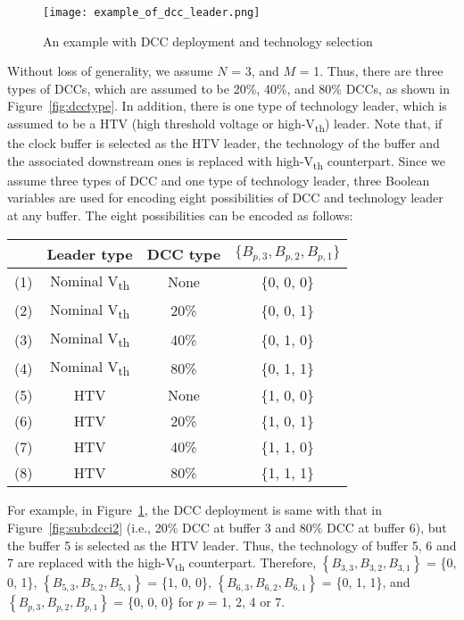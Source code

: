 \begin{figure}
    \centering
    \texttt{[image: example\_of\_dcc\_leader.png]}
    \caption{An example with DCC deployment and technology selection}
    \label{fig:example_dcc_tva}
\end{figure}

Without loss of generality, we assume $N$ = 3, and $M$ = 1. Thus, there are three types of DCCs, which are assumed to be 20\%, 40\%, and 80\% DCCs, as shown in Figure~\ref{fig:dcctype}. In addition, there is one type of technology leader, which is assumed to be a HTV (high threshold voltage or high-V\textsubscript{th}) leader. Note that, if the clock buffer is selected as the HTV leader, the technology of the buffer and the associated downstream ones is replaced with high-V\textsubscript{th} counterpart. Since we assume three types of DCC and one type of technology leader, three Boolean variables are used for encoding eight possibilities of DCC and technology leader at any buffer. The eight possibilities can be encoded as follows:\newline

\begin{tabular}{ | c | c | c | c | }
	\hline
  	 & Leader type & DCC type & $\{B_{p,3}, B_{p,2}, B_{p,1}\}$ \\ \hline
  	(1)\quad & Nominal V\textsubscript{th} & None & \{0, 0, 0\} \\ \hline
  	(2)\quad & Nominal V\textsubscript{th} &20\% &  \{0, 0, 1\} \\ \hline
  	(3)\quad & Nominal V\textsubscript{th} &40\% &  \{0, 1, 0\} \\ \hline
  	(4)\quad & Nominal V\textsubscript{th} &80\% &  \{0, 1, 1\} \\ \hline
	(5)\quad & HTV & None & \{1, 0, 0\} \\ \hline
  	(6)\quad & HTV & 20\% &  \{1, 0, 1\} \\ \hline
  	(7)\quad & HTV & 40\% &  \{1, 1, 0\} \\ \hline
  	(8)\quad & HTV & 80\% &  \{1, 1, 1\} \\ \hline 
\end{tabular}


For example, in Figure~\ref{fig:example_dcc_tva}, the DCC deployment is same with that in Figure~\ref{fig:sub:dcci2} (i.e., 20\% DCC at buffer 3 and 80\% DCC at buffer 6), but the buffer 5 is selected as the HTV leader. Thus, the technology of buffer 5, 6 and 7 are replaced with the high-V\textsubscript{th} counterpart. Therefore, $\left\{B_{3,3}, B_{3,2}, B_{3,1}\right\}$ = \{0, 0, 1\}, $\left\{B_{5,3}, B_{5,2}, B_{5,1}\right\}$ = \{1, 0, 0\}, $\left\{B_{6,3}, B_{6,2}, B_{6,1}\right\}$ = \{0, 1, 1\}, and $\left\{B_{p,3}, B_{p,2}, B_{p,1}\right\}$ = \{0, 0, 0\} for $p$ = 1, 2, 4 or 7.

